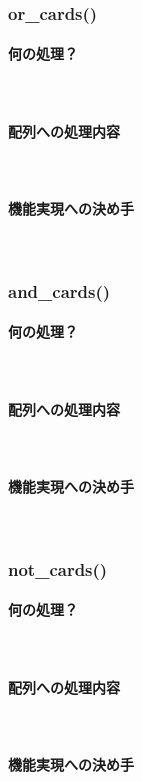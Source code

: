 \documentclass[11pt,a4paper, uplatex]{jsarticle}
\begin{document}
\subsubsection{or\_cards()}
\paragraph{何の処理？}\mbox{}\\
\paragraph{配列への処理内容}\mbox{}\\
\paragraph{機能実現への決め手}\mbox{}\\
%
\subsubsection{and\_cards()}
\paragraph{何の処理？}\mbox{}\\
\paragraph{配列への処理内容}\mbox{}\\
\paragraph{機能実現への決め手}\mbox{}\\
%
\subsubsection{not\_cards()}
\paragraph{何の処理？}\mbox{}\\
\paragraph{配列への処理内容}\mbox{}\\
\paragraph{機能実現への決め手}\mbox{}\\
%
\end{document}
